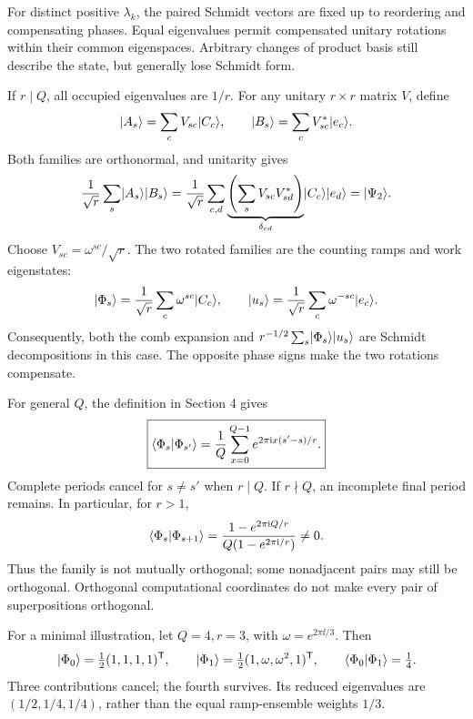 
For distinct positive \(\lambda_k\), the paired Schmidt vectors are fixed up to reordering and compensating phases. Equal eigenvalues permit compensated unitary rotations within their common eigenspaces. Arbitrary changes of product basis still describe the state, but generally lose Schmidt form.

If \(r\mid Q\), all occupied eigenvalues are \(1/r\). For any unitary \(r\times r\) matrix \(V\), define
\[
\lvert A_s\rangle=\sum_cV_{sc}\lvert C_c\rangle,
\qquad
\lvert B_s\rangle=\sum_cV_{sc}^{*}\lvert e_c\rangle.
\]
Both families are orthonormal, and unitarity gives
\[
\frac1{\sqrt r}\sum_s\lvert A_s\rangle\lvert B_s\rangle
=\frac1{\sqrt r}\sum_{c,d}
\underbrace{\left(\sum_sV_{sc}V_{sd}^{*}\right)}_{\delta_{cd}}
\lvert C_c\rangle\lvert e_d\rangle
=\lvert\Psi_2\rangle.
\]
Choose \(V_{sc}=\omega^{sc}/\sqrt r\). The two rotated families are the counting ramps and work eigenstates:
\[
\lvert\Phi_s\rangle=\frac1{\sqrt r}\sum_c\omega^{sc}\lvert C_c\rangle,
\qquad
\lvert u_s\rangle=\frac1{\sqrt r}\sum_c\omega^{-sc}\lvert e_c\rangle.
\]
Consequently, both the comb expansion and \(r^{-1/2}\sum_s\lvert\Phi_s\rangle\lvert u_s\rangle\) are Schmidt decompositions in this case. The opposite phase signs make the two rotations compensate.

For general \(Q\), the definition in Section 4 gives
\[
\boxed{\langle\Phi_s|\Phi_{s'}\rangle
=\frac1Q\sum_{x=0}^{Q-1}e^{2\pi\mathrm{i} x(s'-s)/r}.}
\]
Complete periods cancel for \(s\ne s'\) when \(r\mid Q\). If \(r\nmid Q\), an incomplete final period remains. In particular, for \(r>1\),
\[
\langle\Phi_s|\Phi_{s+1}\rangle
=\frac{1-e^{2\pi\mathrm{i} Q/r}}{Q(1-e^{2\pi\mathrm{i}/r})}\ne0.
\]
Thus the family is not mutually orthogonal; some nonadjacent pairs may still be orthogonal. Orthogonal computational coordinates do not make every pair of superpositions orthogonal.

For a minimal illustration, let \(Q=4,r=3\), with \(\omega=e^{2\pi\ii/3}\). Then
\[
\lvert\Phi_0\rangle=\tfrac12(1,1,1,1)^{\mathsf T},\qquad
\lvert\Phi_1\rangle=\tfrac12(1,\omega,\omega^2,1)^{\mathsf T},
\qquad
\langle\Phi_0|\Phi_1\rangle=\tfrac14.
\]
Three contributions cancel; the fourth survives. Its reduced eigenvalues are \((1/2,1/4,1/4)\), rather than the equal ramp-ensemble weights \(1/3\).

